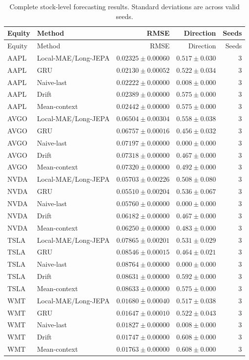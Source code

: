 \begin{longtable}{llrrr}
\caption{Complete stock-level forecasting results. Standard deviations are across valid seeds.}\label{tab:appendix_stock_metrics}\\
\toprule
Equity & Method & RMSE & Direction & Seeds \\
\midrule
\endfirsthead
\toprule
Equity & Method & RMSE & Direction & Seeds \\
\midrule
\endhead
AAPL & Local-MAE/Long-JEPA & $0.02325 \pm 0.00060$ & $0.517 \pm 0.030$ & 3 \\
AAPL & GRU & $0.02130 \pm 0.00052$ & $0.522 \pm 0.034$ & 3 \\
AAPL & Naive-last & $0.02222 \pm 0.00000$ & $0.008 \pm 0.000$ & 3 \\
AAPL & Drift & $0.02389 \pm 0.00000$ & $0.575 \pm 0.000$ & 3 \\
AAPL & Mean-context & $0.02442 \pm 0.00000$ & $0.575 \pm 0.000$ & 3 \\
AVGO & Local-MAE/Long-JEPA & $0.06504 \pm 0.00304$ & $0.558 \pm 0.038$ & 3 \\
AVGO & GRU & $0.06757 \pm 0.00016$ & $0.456 \pm 0.032$ & 3 \\
AVGO & Naive-last & $0.07197 \pm 0.00000$ & $0.000 \pm 0.000$ & 3 \\
AVGO & Drift & $0.07318 \pm 0.00000$ & $0.467 \pm 0.000$ & 3 \\
AVGO & Mean-context & $0.07320 \pm 0.00000$ & $0.492 \pm 0.000$ & 3 \\
NVDA & Local-MAE/Long-JEPA & $0.05703 \pm 0.00226$ & $0.508 \pm 0.080$ & 3 \\
NVDA & GRU & $0.05510 \pm 0.00204$ & $0.536 \pm 0.067$ & 3 \\
NVDA & Naive-last & $0.05760 \pm 0.00000$ & $0.000 \pm 0.000$ & 3 \\
NVDA & Drift & $0.06182 \pm 0.00000$ & $0.467 \pm 0.000$ & 3 \\
NVDA & Mean-context & $0.06250 \pm 0.00000$ & $0.483 \pm 0.000$ & 3 \\
TSLA & Local-MAE/Long-JEPA & $0.07865 \pm 0.00201$ & $0.531 \pm 0.029$ & 3 \\
TSLA & GRU & $0.08546 \pm 0.00015$ & $0.464 \pm 0.021$ & 3 \\
TSLA & Naive-last & $0.08764 \pm 0.00000$ & $0.000 \pm 0.000$ & 3 \\
TSLA & Drift & $0.08631 \pm 0.00000$ & $0.592 \pm 0.000$ & 3 \\
TSLA & Mean-context & $0.08633 \pm 0.00000$ & $0.575 \pm 0.000$ & 3 \\
WMT & Local-MAE/Long-JEPA & $0.01680 \pm 0.00040$ & $0.517 \pm 0.038$ & 3 \\
WMT & GRU & $0.01647 \pm 0.00010$ & $0.522 \pm 0.043$ & 3 \\
WMT & Naive-last & $0.01827 \pm 0.00000$ & $0.008 \pm 0.000$ & 3 \\
WMT & Drift & $0.01747 \pm 0.00000$ & $0.608 \pm 0.000$ & 3 \\
WMT & Mean-context & $0.01763 \pm 0.00000$ & $0.608 \pm 0.000$ & 3 \\
\bottomrule
\end{longtable}
